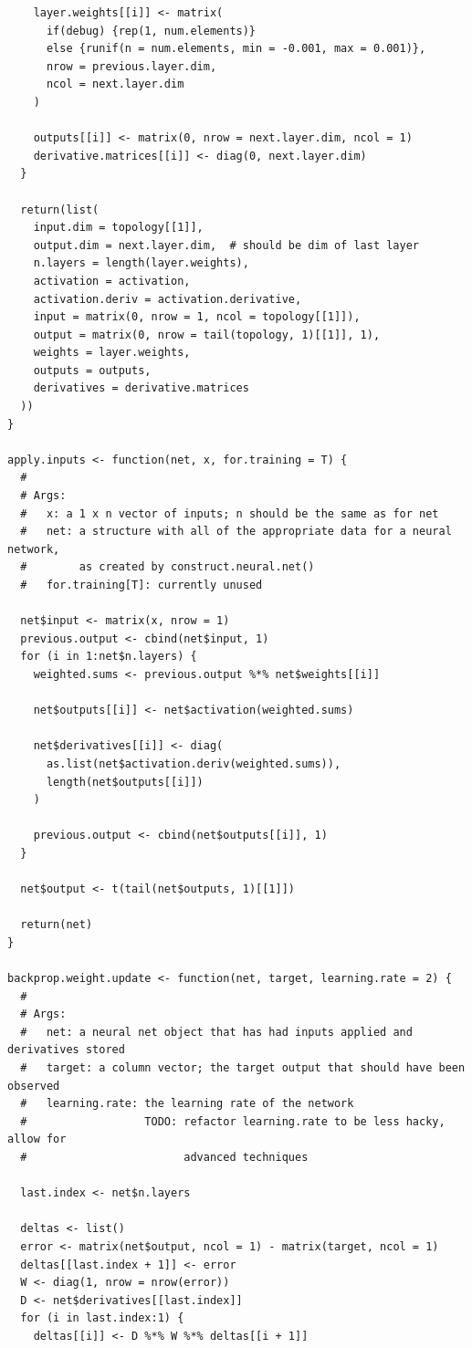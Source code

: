 \documentclass{article}
\begin{document}
\begin{verbatim}
    layer.weights[[i]] <- matrix(
      if(debug) {rep(1, num.elements)}
      else {runif(n = num.elements, min = -0.001, max = 0.001)},
      nrow = previous.layer.dim,
      ncol = next.layer.dim
    )

    outputs[[i]] <- matrix(0, nrow = next.layer.dim, ncol = 1)
    derivative.matrices[[i]] <- diag(0, next.layer.dim)
  }

  return(list(
    input.dim = topology[[1]],
    output.dim = next.layer.dim,  # should be dim of last layer
    n.layers = length(layer.weights),
    activation = activation,
    activation.deriv = activation.derivative,
    input = matrix(0, nrow = 1, ncol = topology[[1]]),
    output = matrix(0, nrow = tail(topology, 1)[[1]], 1),
    weights = layer.weights,
    outputs = outputs,
    derivatives = derivative.matrices
  ))
}

apply.inputs <- function(net, x, for.training = T) {
  #
  # Args:
  #   x: a 1 x n vector of inputs; n should be the same as for net
  #   net: a structure with all of the appropriate data for a neural network,
  #        as created by construct.neural.net()
  #   for.training[T]: currently unused

  net$input <- matrix(x, nrow = 1)
  previous.output <- cbind(net$input, 1)
  for (i in 1:net$n.layers) {
    weighted.sums <- previous.output %*% net$weights[[i]]

    net$outputs[[i]] <- net$activation(weighted.sums)

    net$derivatives[[i]] <- diag(
      as.list(net$activation.deriv(weighted.sums)),
      length(net$outputs[[i]])
    )

    previous.output <- cbind(net$outputs[[i]], 1)
  }

  net$output <- t(tail(net$outputs, 1)[[1]])

  return(net)
}

backprop.weight.update <- function(net, target, learning.rate = 2) {
  #
  # Args:
  #   net: a neural net object that has had inputs applied and derivatives stored
  #   target: a column vector; the target output that should have been observed
  #   learning.rate: the learning rate of the network
  #                  TODO: refactor learning.rate to be less hacky, allow for
  #                        advanced techniques

  last.index <- net$n.layers

  deltas <- list()
  error <- matrix(net$output, ncol = 1) - matrix(target, ncol = 1)
  deltas[[last.index + 1]] <- error
  W <- diag(1, nrow = nrow(error))
  D <- net$derivatives[[last.index]]
  for (i in last.index:1) {
    deltas[[i]] <- D %*% W %*% deltas[[i + 1]]


\end{verbatim}
\end{document}
